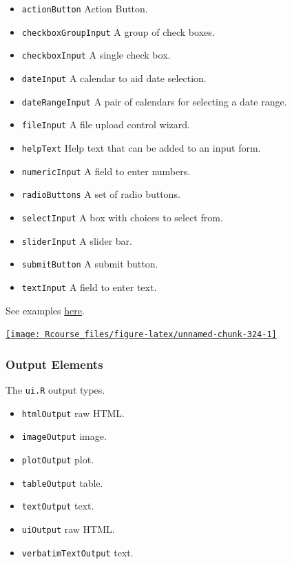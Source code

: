 \documentclass[]{book}
\providecommand{\tightlist}{%
  \setlength{\itemsep}{0pt}\setlength{\parskip}{0pt}}
\theoremstyle{definition}
\theoremstyle{definition}
\theoremstyle{definition}
\theoremstyle{remark}
\begin{document}
\begin{itemize}
\tightlist
\item
  \texttt{actionButton} Action Button.
\item
  \texttt{checkboxGroupInput} A group of check boxes.
\item
  \texttt{checkboxInput} A single check box.
\item
  \texttt{dateInput} A calendar to aid date selection.
\item
  \texttt{dateRangeInput} A pair of calendars for selecting a date
  range.
\item
  \texttt{fileInput} A file upload control wizard.
\item
  \texttt{helpText} Help text that can be added to an input form.
\item
  \texttt{numericInput} A field to enter numbers.
\item
  \texttt{radioButtons} A set of radio buttons.
\item
  \texttt{selectInput} A box with choices to select from.
\item
  \texttt{sliderInput} A slider bar.
\item
  \texttt{submitButton} A submit button.
\item
  \texttt{textInput} A field to enter text.
\end{itemize}

See examples
\href{https://shiny.rstudio.com/gallery/widget-gallery.html}{here}.

\href{https://shiny.rstudio.com/gallery/widget-gallery.html}{\texttt{[image: Rcourse\_files/figure-latex/unnamed-chunk-324-1]} }

\subsubsection{Output Elements}\label{output-elements}

The \texttt{ui.R} output types.

\begin{itemize}
\tightlist
\item
  \texttt{htmlOutput} raw HTML.
\item
  \texttt{imageOutput} image.
\item
  \texttt{plotOutput} plot.
\item
  \texttt{tableOutput} table.
\item
  \texttt{textOutput} text.
\item
  \texttt{uiOutput} raw HTML.
\item
  \texttt{verbatimTextOutput} text.
\end{itemize}
\end{document}
